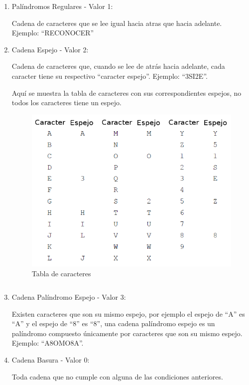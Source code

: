 \documentclass[letter,10pt]{article}
\begin{document}
\begin{enumerate}
\item Palíndromos Regulares - Valor 1:

Cadena de caracteres que se lee igual hacia atras que hacia adelante. Ejemplo: ``RECONOCER''


\item Cadena Espejo - Valor 2:

Cadena de caracteres que, cuando se lee de atrás hacia adelante, cada caracter tiene su respectivo ``caracter espejo''. Ejemplo: ``3SI2E''.

Aquí se muestra la tabla de caracteres con sus correspondientes espejos, no todos los caracteres tiene un espejo.

\begin{figure}[h!]
  \begin{center}
  	\includegraphics[scale=0.5]{adjunto}\caption{Tabla de caracteres}
  \end{center} 
\end{figure}

$$$$
$$$$
$$$$

\item Cadena Palíndromo Espejo - Valor 3:

Existen caracteres que son su mismo espejo, por ejemplo el espejo de ``A'' es ``A'' y el espejo de ``8'' es ``8'', una cadena palíndromo espejo es un palíndromo compuesto únicamente por caracteres que son su mismo espejo. Ejemplo: ``A8OMO8A''.


\item Cadena Basura - Valor 0:

Toda cadena que no cumple con alguna de las condiciones anteriores.
\end{enumerate}
\end{document}
